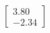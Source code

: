 \documentclass[preview]{standalone}
\begin{document}
\begin{align*}
\begin{bmatrix} 3.80 \\ -2.34 \end{bmatrix}
\end{align*}
\end{document}
